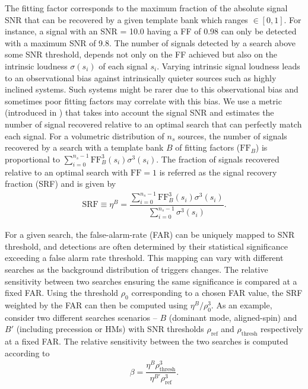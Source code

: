 The fitting factor corresponds to the maximum fraction of the absolute signal SNR that can be recovered by a given template bank which ranges $\in [0, 1]$. For instance, a signal with an SNR = 10.0 having a FF of 0.98 can only be detected with a maximum SNR of 9.8. The number of signals detected by a search above some SNR threshold, depends not only on the FF achieved but also on the intrinsic loudness $\sigma(s_i)$ of each signal $s_i$. Varying intrinsic signal loudness leads to an observational bias against intrinsically quieter sources such as highly inclined systems. Such systems might be rarer due to this observational bias and sometimes poor fitting factors may correlate with this bias. We use a metric (introduced in \cite{Buonanno:2002fy}) that takes into account the signal SNR and estimates the number of signal recovered relative to an optimal search that can perfectly match each signal. For a volumetric distribution of $n_s$ sources, the number of signals recovered by a search with a template bank $B$ of fitting factors ($\text{FF}_B$) is proportional to $\sum \limits_{i=0}^{n_s-1} \text{FF}_B^3(s_i)\sigma^3(s_i)$. The fraction of signals recovered relative to an optimal search with $\text{FF} = 1$ is referred as the signal recovery fraction (SRF) and is given by
\begin{align} 
    \text{SRF} \equiv \eta^B = \dfrac{\sum \limits_{i=0}^{n_s-1} \text{FF}^3_B(s_i)\sigma^3(s_i)}{\sum \limits_{i=0}^{n_s-1} \sigma^3(s_i)}.
    \label{eq:SRF}
\end{align}


For a given search, the false-alarm-rate (FAR) can be uniquely mapped to SNR threshold, and detections are often determined by their statistical significance exceeding a false alarm rate threshold. This mapping can vary with different searches as the background distribution of triggers changes. The relative sensitivity between two searches ensuring the same significance is compared at a fixed FAR. Using the threshold $\rho_0$ corresponding to a chosen FAR value, the SRF weighted by the FAR can then be computed using $\eta^{B}/\rho_{0}^3$. As an example, consider two different searches scenarios -- $B$ (dominant mode, aligned-spin) and $B'$ (including precession or HMs) with SNR thresholds $\rho_{\text{ref}}$ and $\rho_{\text{thresh}}$ respectively at a fixed FAR. The relative sensitivity between the two searches is computed according to
\begin{align}
    \beta = \dfrac{\eta^B\rho^3_{\text{thresh}}}{\eta^{B'}\rho^3_{\text{ref}}}
    \label{eq:relative_sensitivity}.
\end{align}

